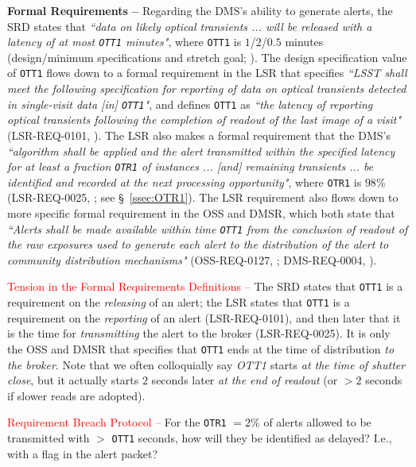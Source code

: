 \documentclass[DM,authoryear,toc]{lsstdoc}
\begin{document}
{\bf Formal Requirements --} Regarding the DMS's ability to generate alerts, the SRD states that {\it ``data on likely optical transients ... will be released with a latency of at most {\tt OTT1} minutes"}, where {\tt OTT1} is $1$/$2$/$0.5$ minutes (design/minimum specifications and stretch goal; ). The design specification value of {\tt OTT1} flows down to a formal requirement in the LSR that specifies {\it ``LSST shall meet the following specification for reporting of data on optical transients detected in single-visit data [in] {\tt OTT1}"}, and defines {\tt OTT1} as {\it ``the latency of reporting optical transients following the completion of readout of the last image of a visit"} (LSR-REQ-0101, ). The LSR also makes a formal requirement that the DMS's {\it ``algorithm shall be applied and the alert transmitted within the specified latency for at least a fraction {\tt OTR1} of instances ... [and] remaining transients ... be identified and recorded at the next processing opportunity"}, where {\tt OTR1} is $98\%$ (LSR-REQ-0025, ; see \S~\ref{ssec:OTR1}). The LSR requirement also flows down to more specific formal requirement in the OSS and DMSR, which both state that {\it ``Alerts shall be made available within time {\tt OTT1} from the conclusion of readout of the raw exposures used to generate each alert to the distribution of the alert to community distribution mechanisms"} (OSS-REQ-0127, ; DMS-REQ-0004, ). 

\textcolor{red}{Tension in the Formal Requirements Definitions --} The SRD states that {\tt OTT1} is a requirement on the {\it releasing} of an alert; the LSR states that {\tt OTT1} is a requirement on the {\it reporting} of an alert (LSR-REQ-0101), and then later that it is the time for {\it transmitting} the alert to the broker (LSR-REQ-0025). It is only the OSS and DMSR that specifies that {\tt OTT1} ends at the time of distribution {\it to the broker}. Note that we often colloquially say {\it OTT1} starts {\it at the time of shutter close}, but it actually starts $2$ seconds later {\it at the end of readout} (or $>2$ seconds if slower reads are adopted). 

\textcolor{red}{Requirement Breach Protocol --} For the {\tt OTR1} $=2\%$ of alerts allowed to be transmitted with $>$ {\tt OTT1} seconds, how will they be identified as delayed? I.e., with a flag in the alert packet?

\end{document}

